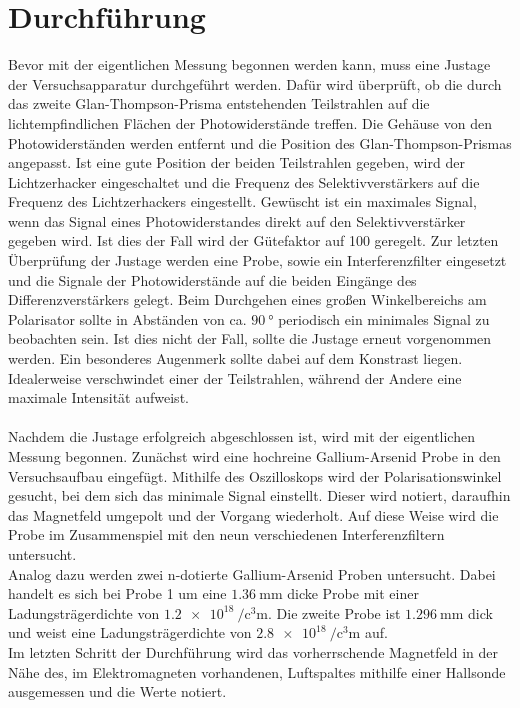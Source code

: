 \section{Durchführung}
Bevor mit der eigentlichen Messung begonnen werden kann, muss eine Justage der Versuchsapparatur durchgeführt
werden. Dafür wird überprüft, ob die durch das zweite Glan-Thompson-Prisma entstehenden Teilstrahlen auf
die lichtempfindlichen Flächen der Photowiderstände treffen. Die Gehäuse von den Photowiderständen werden
entfernt und die Position des Glan-Thompson-Prismas angepasst. Ist eine gute Position der beiden
Teilstrahlen gegeben, wird der Lichtzerhacker eingeschaltet und die Frequenz des Selektivverstärkers auf
die Frequenz des Lichtzerhackers eingestellt. Gewüscht ist ein maximales Signal, wenn das Signal eines
Photowiderstandes direkt auf den Selektivverstärker gegeben wird. Ist dies der Fall wird der
Gütefaktor auf 100 geregelt. Zur letzten Überprüfung der Justage werden eine Probe, sowie ein
Interferenzfilter eingesetzt und die Signale der Photowiderstände auf die beiden Eingänge des
Differenzverstärkers gelegt. Beim Durchgehen eines großen Winkelbereichs am Polarisator sollte in Abständen von ca.
$\SI{90}{\degree}$ periodisch ein minimales Signal zu beobachten sein. Ist dies nicht der Fall, sollte
die Justage erneut vorgenommen werden. Ein besonderes Augenmerk sollte dabei auf dem Konstrast liegen.
Idealerweise verschwindet einer der Teilstrahlen, während der Andere eine maximale Intensität aufweist. \\
\\
Nachdem die Justage erfolgreich abgeschlossen ist, wird mit der eigentlichen Messung begonnen. Zunächst
wird eine hochreine Gallium-Arsenid Probe in den Versuchsaufbau eingefügt. Mithilfe des Oszilloskops
wird der Polarisationswinkel gesucht, bei dem sich das minimale Signal einstellt. Dieser wird notiert,
daraufhin das Magnetfeld umgepolt und der Vorgang wiederholt. Auf diese Weise wird die Probe im Zusammenspiel
mit den neun verschiedenen Interferenzfiltern untersucht. \\
Analog dazu werden zwei n-dotierte Gallium-Arsenid Proben untersucht. Dabei handelt es sich bei Probe 1
um eine $\SI{1.36}{\milli\meter}$ dicke Probe mit einer Ladungsträgerdichte von
$\SI{1.2e18}{\per\cubic\centi\meter}$. Die zweite Probe ist $\SI{1.296}{\milli\meter}$ dick und weist eine
Ladungsträgerdichte von $\SI{2,8e18}{\per\cubic\centi\meter}$ auf. \\
Im letzten Schritt der Durchführung wird das vorherrschende Magnetfeld in der Nähe des, im Elektromagneten
vorhandenen, Luftspaltes mithilfe einer Hallsonde ausgemessen und die Werte notiert.
